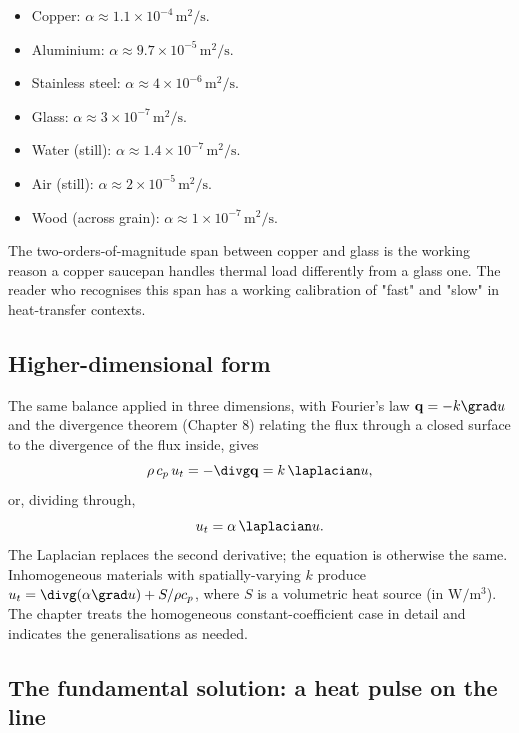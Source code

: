 \begin{itemize}[leftmargin=*]
  \item Copper: $\alpha \approx 1.1 \times 10^{-4}\,\si{\meter\squared\per\second}$.
  \item Aluminium: $\alpha \approx 9.7 \times 10^{-5}\,\si{\meter\squared\per\second}$.
  \item Stainless steel: $\alpha \approx 4 \times 10^{-6}\,\si{\meter\squared\per\second}$.
  \item Glass: $\alpha \approx 3 \times 10^{-7}\,\si{\meter\squared\per\second}$.
  \item Water (still): $\alpha \approx 1.4 \times 10^{-7}\,\si{\meter\squared\per\second}$.
  \item Air (still): $\alpha \approx 2 \times 10^{-5}\,\si{\meter\squared\per\second}$.
  \item Wood (across grain): $\alpha \approx 1 \times 10^{-7}\,\si{\meter\squared\per\second}$.
\end{itemize}

The two-orders-of-magnitude span between copper and glass is the
working reason a copper saucepan handles thermal load differently
from a glass one. The reader who recognises this span has a
working calibration of "fast" and "slow" in heat-transfer
contexts.

\subsection{Higher-dimensional form}

The same balance applied in three dimensions, with Fourier's law
$\mathbf{q} = -k \grad u$ and the divergence theorem (Chapter 8)
relating the flux through a closed surface to the divergence of
the flux inside, gives
\[
\rho\, c_{p}\, u_{t} = -\divg \mathbf{q} = k \, \laplacian u,
\]
or, dividing through,
\[
u_{t} = \alpha\, \laplacian u.
\]
The Laplacian replaces the second derivative; the equation is
otherwise the same. Inhomogeneous materials with
spatially-varying $k$ produce $u_{t} = \divg(\alpha \grad u) +
S/\rho c_{p}$, where $S$ is a volumetric heat source (in $\si
{\watt\per\meter\cubed}$). The chapter treats the homogeneous
constant-coefficient case in detail and indicates the
generalisations as needed.

\subsection{The fundamental solution: a heat pulse on the line}

